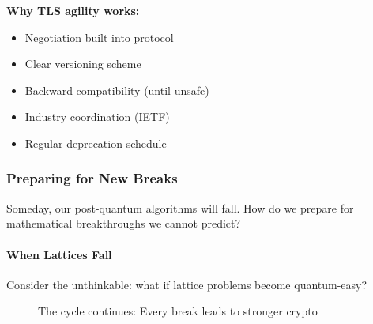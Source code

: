 \documentclass[11pt,a4paper]{article}
\begin{document}
\textbf{Why TLS agility works:}
\begin{itemize}
    \item Negotiation built into protocol
    \item Clear versioning scheme
    \item Backward compatibility (until unsafe)
    \item Industry coordination (IETF)
    \item Regular deprecation schedule
\end{itemize}

\subsubsection{Preparing for New Breaks}

Someday, our post-quantum algorithms will fall. How do we prepare for mathematical breakthroughs we cannot predict?

\paragraph{When Lattices Fall}

Consider the unthinkable: what if lattice problems become quantum-easy?

\begin{figure}[h]
\centering
{}
\caption{The cycle continues: Every break leads to stronger crypto}
\end{figure}
\end{document}
